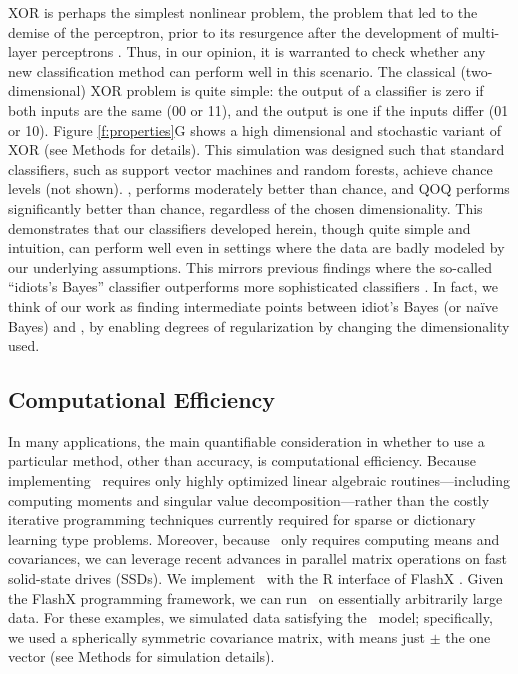 \documentclass[10pt]{article}
\begin{document}
  XOR is perhaps the simplest nonlinear problem, the problem that led to the demise of the perceptron, prior to its resurgence after the development of multi-layer perceptrons \cite{Bishop2006a}.  Thus, in our opinion, it is warranted to check whether any new classification method can perform well in this scenario.  The classical (two-dimensional) XOR problem is quite simple: the output of a classifier is zero if both inputs are the same (00 or 11), and the output is one if the inputs differ (01 or 10).  Figure \ref{f:properties}G shows a high dimensional and stochastic variant of XOR (see Methods for details).  This simulation was designed such that standard classifiers, such as support vector machines and random forests, achieve chance levels (not shown).  \Lol, performs moderately better than chance, and QOQ performs significantly better than chance, regardless of the chosen dimensionality.  This demonstrates that our classifiers developed herein, though quite simple and intuition, can perform well even in settings where the data are badly modeled by our underlying assumptions.  This mirrors previous findings where the so-called ``idiots's Bayes'' classifier outperforms more sophisticated classifiers \cite{Bickel2004a}.  In fact, we think of our work as finding intermediate points between idiot's Bayes (or na\"ive Bayes) and \Fld, by enabling degrees of regularization by changing the dimensionality used.


\subsection*{Computational Efficiency}

In many applications, the main quantifiable consideration in whether to use a particular method, other than accuracy, is computational efficiency.  Because implementing \Lol~requires only highly optimized linear algebraic routines---including computing moments and singular value decomposition---rather than the costly iterative programming techniques currently required for sparse or dictionary learning type problems.  Moreover, because \Lol~only requires computing means and covariances, we can leverage recent advances in parallel matrix operations \cite{FlashMatrix} on fast solid-state drives (SSDs). We implement \Lol~with the R interface of FlashX \cite{FlashGraph, FlashMatrix, FlashEigen}.
Given the FlashX programming framework, we can run \Lol~on essentially arbitrarily large data.  For these examples, we simulated data satisfying the \Lda~model; specifically, we used a spherically symmetric covariance matrix, with means just $\pm$ the one vector (see Methods for simulation details).
\end{document}
